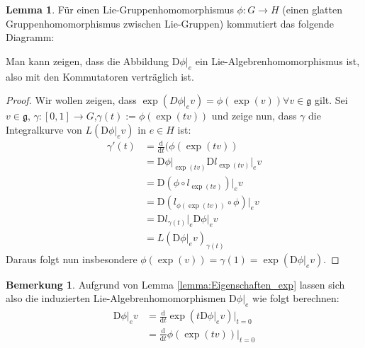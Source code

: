 \documentclass[a4paper]{scrbook}
\numberwithin{equation}{chapter}
\newcommand{\D}{\mathrm{d}}
\newcommand{\DD}{\mathrm{D}}
\theoremstyle{definition}
\newtheorem{lemma}[defn]{Lemma}
\newtheorem{bem}[defn]{Bemerkung}
\begin{document}
		\begin{lemma}
			Für einen Lie-Gruppenhomomorphismus $\phi\colon G\rightarrow H$ (einen glatten Gruppenhomomorphismus zwischen Lie-Gruppen) kommutiert das folgende Diagramm:
			\begin{center}
			\end{center}
			Man kann zeigen, dass die Abbildung $\DD\phi\vert_e$ ein Lie-Algebrenhomomorphismus ist, also mit den Kommutatoren verträglich ist.
			\begin{proof}
				Wir wollen zeigen, dass $\exp(D\phi\vert_e v)=\phi(\exp(v))\forall v\in\mathfrak{g}$ gilt. Sei $v\in\mathfrak{g}$, ${\gamma\colon [0,1]\rightarrow G}$,$ \gamma(t):=\phi(\exp(tv))$ und zeige nun, dass $\gamma$ die Integralkurve von $L(\DD\phi\vert_e v)$ in $e\in H$ ist:
				\begin{align*}
					\gamma'(t)&=\frac{\D}{\D t}(\phi(\exp(tv))\\
					&=\DD\phi\vert_{\exp(tv)}\DD l_{\exp(tv)}\vert_e v\\
					&=\DD(\phi\circ l_{\exp(tv)})\vert_e v\\
					&=\DD(l_{\phi(\exp(tv))}\circ\phi)\vert_e v\\
					&=\DD l_{\gamma(t)}\vert_e\DD\phi\vert_ev\\
					&=L(\DD\phi\vert_e v)_{\gamma(t)}
				\end{align*}
				Daraus folgt nun insbesondere $\phi(\exp(v))=\gamma(1)=\exp(\DD\phi\vert_e v)$.
			\end{proof}
		\end{lemma}
		\begin{bem}\label{bem:exp_induziert_Abbildungen}
			Aufgrund von Lemma \ref{lemma:Eigenschaften_exp} lassen sich also die induzierten Lie-Algebrenhomomorphismen $\DD\phi\vert_e$ wie folgt berechnen:
			\begin{align*}
				\DD\phi\vert_e v&=\frac{\D}{\D t}\exp(t \DD\phi\vert_e v)\Big\vert_{t=0}\\
				&=\frac{\D}{\D t}\phi(\exp(tv))\Big\vert_{t=0}
			\end{align*}
		\end{bem}
\end{document}
